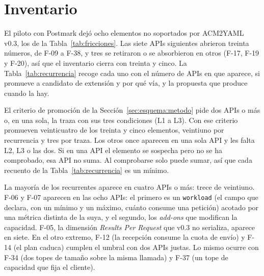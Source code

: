 \section{Inventario}\label{sec:esquema:inventario}\label{sec:evolucion:inventario}

El piloto con Postmark dejó ocho elementos no soportados por ACM2YAML v0.3, los de la Tabla~\ref{tab:fricciones}.
Las siete APIs siguientes abrieron treinta números, de F-09 a F-38, y tres se retiraron o se absorbieron en otros (F-17, F-19 y F-20), así que el inventario cierra con treinta y cinco.
La Tabla~\ref{tab:recurrencia} recoge cada uno con el número de APIs en que aparece, si promueve a candidato de extensión y por qué vía, y la propuesta que produce cuando la hay.

El criterio de promoción de la Sección~\ref{sec:esquema:metodo} pide dos APIs o más o, en una sola, la traza con sus tres condiciones (L1 a L3).
Con ese criterio promueven veinticuatro de los treinta y cinco elementos, veintiuno por recurrencia y tres por traza.
Los otros once aparecen en una sola API y les falta L2, L3 o las dos.
Si en una API el elemento se sospecha pero no se ha comprobado, esa API no suma.
Al comprobarse solo puede sumar, así que cada recuento de la Tabla~\ref{tab:recurrencia} es un mínimo.

La mayoría de los recurrentes aparece en cuatro APIs o más: trece de veintiuno.
F-06 y F-07 aparecen en las ocho APIs: el primero es un \texttt{workload} (el campo que declara, con un mínimo y un máximo, cuánto consume una petición) acotado por una métrica distinta de la suya, y el segundo, los \textit{add-ons} que modifican la capacidad.
F-05, la dimensión \textit{Results Per Request} que v0.3 no serializa, aparece en siete.
En el otro extremo, F-12 (la recepción consume la cuota de envío) y F-14 (el plan caduca) cumplen el umbral con dos APIs justas.
Lo mismo ocurre con F-34 (dos topes de tamaño sobre la misma llamada) y F-37 (un tope de capacidad que fija el cliente).

